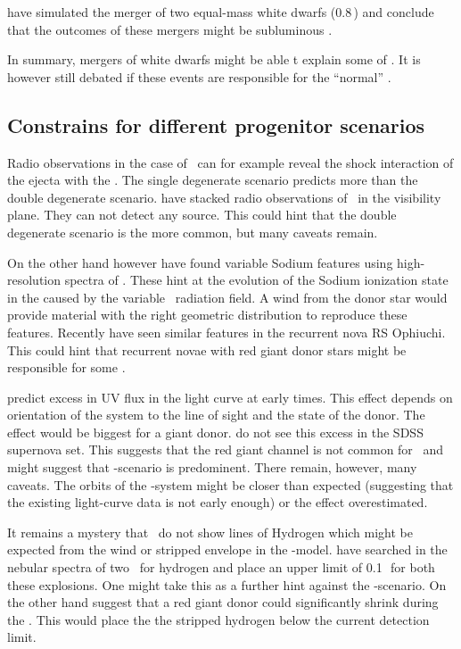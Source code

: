 \cite{2010Natur.463...61P} have simulated the merger of two equal-mass white dwarfs (0.8\,\msun) and conclude that the outcomes of these mergers might be subluminous \sneia.

In summary, mergers of white dwarfs might be able t explain some of \snia. It is however still debated if these events are responsible for the ``normal'' \sneia. 

\subsection{Constrains for different progenitor scenarios}

Radio observations in the case of \sneia\ can for example reveal the shock interaction of the ejecta with the \csm. The single degenerate scenario predicts more \csm than the double degenerate scenario. \citep{2011arXiv1105.6188H} have stacked radio observations of \sneia\ in the visibility plane. They can not detect any source. This could hint that the double degenerate scenario is the more common, but many caveats remain.

On the other hand however \cite{2007Sci...317..924P} have found variable Sodium features using high-resolution spectra of \sneia. These hint at the evolution of the Sodium ionization state in the \csm caused by the variable \snia\ radiation field. A wind from the donor star would provide material with the right geometric distribution to reproduce these features. Recently \cite{2011A&A...530A..63P} have seen similar features in the recurrent nova RS Ophiuchi. This could hint that recurrent novae with red giant donor stars might be responsible for some \sneia. 


\cite{2010ApJ...708.1025K} predict excess in UV flux in the \snia light curve at early times. This effect depends on orientation of the system to the line of sight and the state of the donor. The effect would be biggest for a giant donor. \cite{2010ApJ...722.1691H} do not see this excess in the SDSS supernova set. This suggests that the red giant channel is not common for \sneia\ and might suggest that \dd-scenario is predominent. There remain, however, many caveats. The orbits of the \sd-system might be closer than expected (suggesting that the existing light-curve data is not early enough) or the effect overestimated.

It remains a mystery that \sneia\ do not show lines of Hydrogen which might be expected from the wind or stripped envelope in the \sd-model. \citet{2007ApJ...670.1275L} have searched in the nebular spectra of two \sneia\ for hydrogen and place an upper limit of 0.1\,\msun\ for both these explosions. One might take this as a further hint against the \sd-scenario. On the other hand \citet{2011ApJ...730L..34J} suggest that a red giant donor could significantly shrink during the \rlof. This would place the the stripped hydrogen below the current detection limit. 

